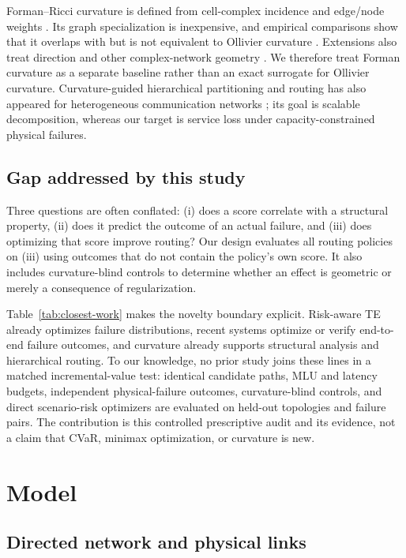 \documentclass[preprint,12pt]{elsarticle}
\begin{document}
Forman--Ricci curvature is defined from cell-complex incidence and edge/node
weights \cite{forman2003}. Its graph specialization is inexpensive, and
empirical comparisons show that it overlaps with but is not equivalent to
Ollivier curvature \cite{sreejith2016forman,samal2018}. Extensions also treat
direction and other complex-network geometry \cite{saucan2019directed}. We
therefore treat Forman curvature as a separate baseline rather than an exact
surrogate for Ollivier curvature. Curvature-guided hierarchical partitioning
and routing has also appeared for heterogeneous communication networks
\cite{chiriac2026hierarchical}; its goal is scalable decomposition, whereas our
target is service loss under capacity-constrained physical failures.

\subsection{Gap addressed by this study}

Three questions are often conflated: (i) does a score correlate with a
structural property, (ii) does it predict the outcome of an actual failure, and
(iii) does optimizing that score improve routing? Our design evaluates all
routing policies on (iii) using outcomes that do not contain the policy's own
score. It also includes curvature-blind controls to determine whether an effect
is geometric or merely a consequence of regularization.

Table~\ref{tab:closest-work} makes the novelty boundary explicit. Risk-aware TE
already optimizes failure distributions, recent systems optimize or verify
end-to-end failure outcomes, and curvature already supports structural analysis
and hierarchical routing. To our knowledge, no prior study joins these lines in a
matched incremental-value test: identical candidate paths, MLU and latency
budgets, independent physical-failure outcomes, curvature-blind controls, and
direct scenario-risk optimizers are evaluated on held-out topologies and
failure pairs. The contribution is this controlled prescriptive audit and its
evidence, not a claim that CVaR, minimax optimization, or curvature is new.



\section{Model}

\subsection{Directed network and physical links}
\end{document}

